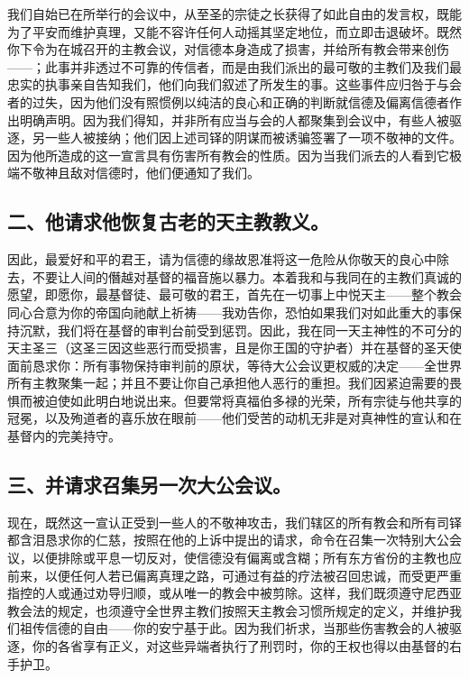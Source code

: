 我们自始已在所举行的会议中，从至圣的宗徒之长获得了如此自由的发言权，既能为了平安而维护真理，又能不容许任何人动摇其坚定地位，而立即击退破坏。既然你下令为在城召开的主教会议，对信德本身造成了损害，并给所有教会带来创伤——；此事并非透过不可靠的传信者，而是由我们派出的最可敬的主教们及我们最忠实的执事亲自告知我们，他们向我们叙述了所发生的事。这些事件应归咎于与会者的过失，因为他们没有照惯例以纯洁的良心和正确的判断就信德及偏离信德者作出明确声明。因为我们得知，并非所有应当与会的人都聚集到会议中，有些人被驱逐，另一些人被接纳；他们因上述司铎的阴谋而被诱骗签署了一项不敬神的文件。因为他所造成的这一宣言具有伤害所有教会的性质。因为当我们派去的人看到它极端不敬神且敌对信德时，他们便通知了我们。\par


\subsection{二、他请求他恢复古老的天主教教义。}

因此，最爱好和平的君王，请为信德的缘故恩准将这一危险从你敬天的良心中除去，不要让人间的僭越对基督的福音施以暴力。本着我和与我同在的主教们真诚的愿望，即愿你，最基督徒、最可敬的君王，首先在一切事上中悦天主——整个教会同心合意为你的帝国向祂献上祈祷——我劝告你，恐怕如果我们对如此重大的事保持沉默，我们将在基督的审判台前受到惩罚。因此，我在同一天主神性的不可分的天主圣三（这圣三因这些恶行而受损害，且是你王国的守护者）并在基督的圣天使面前恳求你：所有事物保持审判前的原状，等待大公会议更权威的决定——全世界所有主教聚集一起；并且不要让你自己承担他人恶行的重担。我们因紧迫需要的畏惧而被迫使如此明白地说出来。但要常将真福伯多禄的光荣，所有宗徒与他共享的冠冕，以及殉道者的喜乐放在眼前——他们受苦的动机无非是对真神性的宣认和在基督内的完美持守。\par


\subsection{三、并请求召集另一次大公会议。}

现在，既然这一宣认正受到一些人的不敬神攻击，我们辖区的所有教会和所有司铎都含泪恳求你的仁慈，按照在他的上诉中提出的请求，命令在召集一次特别大公会议，以便排除或平息一切反对，使信德没有偏离或含糊；所有东方省份的主教也应前来，以便任何人若已偏离真理之路，可通过有益的疗法被召回忠诚，而受更严重指控的人或通过劝导归顺，或从唯一的教会中被剪除。这样，我们既须遵守尼西亚教会法的规定，也须遵守全世界主教们按照天主教会习惯所规定的定义，并维护我们祖传信德的自由——你的安宁基于此。因为我们祈求，当那些伤害教会的人被驱逐，你的各省享有正义，对这些异端者执行了刑罚时，你的王权也得以由基督的右手护卫。\par

